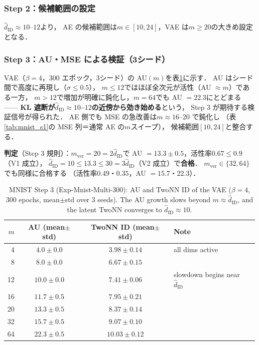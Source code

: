 \documentclass[11pt,a4paper]{jsarticle}
\newcommand{\hatdID}{\hat{d}_{\mathrm{ID}}}
\begin{document}
\subsubsection{Step 2：候補範囲の設定}

$\hatdID \approx 10$--$12$より，
AE の候補範囲は$m \in [10, 24]$，VAE は$m \geq 20$の大きめ設定となる．

\subsubsection{Step 3：AU・MSE による検証（3シード）}

VAE（$\beta = 4$，300 エポック，3シード）の AU$(m)$を表\ref{tab:mnist_s3}に示す．
AU はシード間で高度に再現し（$\sigma \leq 0.5$），
$m \leq 12$ではほぼ全次元が活性（AU $\approx m$）である一方，
$m > 12$で増加が明確に鈍化し，$m = 64$でも AU $= 22.3$にとどまる——
\textbf{KL 遮断が$\hatdID \approx 10$--$12$の近傍から効き始める}という，
Step 3 が期待する検証信号が得られた．
AE 側でも MSE の急改善は$m \approx 16$--20 で鈍化し
（表\ref{tab:mnist_s1}の MSE 列＝通常 AE の$m$スイープ），
候補範囲$[10, 24]$と整合する．

\textbf{判定}（Step 3 規則）：$m_{\mathrm{ver}} = 20 = 2\hatdID$で
AU $= 13.3 \pm 0.5$，活性率$0.67 \leq 0.9$（V1 成立），
$\hatdID = 10 \leq 13.3 \leq 30 = 3\hatdID$（V2 成立）で\textbf{合格}．
$m_{\mathrm{ver}} \in \{32, 64\}$でも同様に合格する
（活性率$0.49$・$0.35$，AU $= 15.7$・$22.3$）．

\begin{table}[H]
\centering
\caption{MNIST Step 3 (Exp-Mnist-Multi-300): AU and TwoNN ID of the VAE
($\beta = 4$, 300 epochs, mean$\pm$std over 3 seeds). The AU growth slows
beyond $m \approx \hatdID$, and the latent TwoNN converges to
$\hatdID \approx 10$.}
\label{tab:mnist_s3}
\small
\begin{tabular}{rccl}
\toprule
$m$ & AU (mean$\pm$std) & TwoNN ID (mean$\pm$std) & Note \\
\midrule
 4 & $4.0 \pm 0.0$ & $3.98 \pm 0.14$ & all dims active \\
 8 & $8.0 \pm 0.0$ & $6.67 \pm 0.15$ & \\
12 & $10.0 \pm 0.0$ & $7.41 \pm 0.06$ & slowdown begins near $\hatdID$ \\
16 & $11.7 \pm 0.5$ & $7.95 \pm 0.21$ & \\
20 & $13.3 \pm 0.5$ & $8.37 \pm 0.14$ & \\
32 & $15.7 \pm 0.5$ & $9.07 \pm 0.10$ & \\
64 & $22.3 \pm 0.5$ & $10.03 \pm 0.12$ & \\
\bottomrule
\end{tabular}
\end{table}
\end{document}
